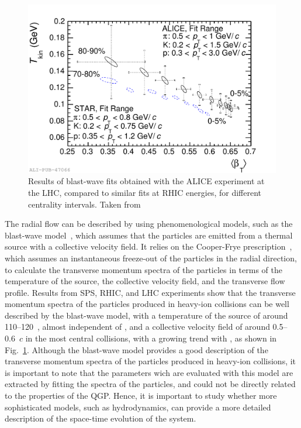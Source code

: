 \begin{figure}[htb]
  \centering
  \includegraphics[width=0.7\linewidth]{Figures/Chapter 1/2014-Feb-27-cBlastWaveVsSTAR.pdf}
  \caption{Results of blast-wave fits obtained with the ALICE experiment at the LHC, compared to similar fits at RHIC energies, for different centrality intervals. Taken from~\cite{ALICE:2013mez}}
  \label{fig:blast_wave_fit}
\end{figure}

The radial flow can be described by using phenomenological models, such as the blast-wave model~\cite{Schnedermann:1993ws}, which assumes that the particles are emitted from a thermal source with a collective velocity field. It relies on the Cooper-Frye prescription~\cite{Cooper:1974mv}, which assumes an instantaneous freeze-out of the particles in the radial direction, to calculate the transverse momentum spectra of the particles in terms of the temperature of the source, the collective velocity field, and the transverse flow profile. Results from SPS, RHIC, and LHC experiments show that the transverse momentum spectra of the particles produced in heavy-ion collisions can be well described by the blast-wave model, with a temperature of the source of around 110--120~\mev, almost independent of \snn, and a collective velocity field of around 0.5--0.6~$c$ in the most central collisions, with a growing trend with \snn, as shown in Fig.~\ref{fig:blast_wave_fit}. Although the blast-wave model provides a good description of the transverse momentum spectra of the particles produced in heavy-ion collisions, it is important to note that the parameters wich are evaluated with this model are extracted by fitting the \mt spectra of the particles, and could not be directly related to the properties of the QGP. Hence, it is important to study whether more sophisticated models, such as hydrodynamics, can provide a more detailed description of the space-time evolution of the system.

